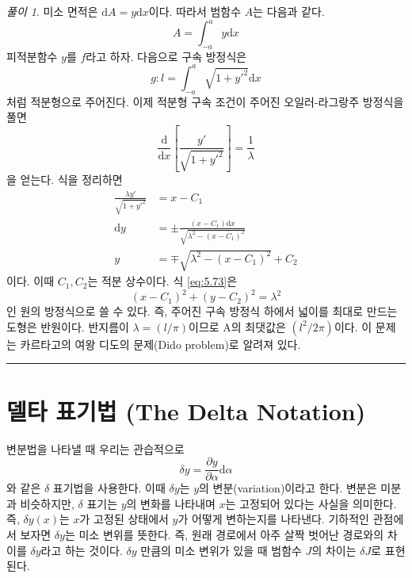 \documentclass[chapter, oneside, b5paper]{oblivoir}
\theoremstyle{plain}
\theoremstyle{definition}
\theoremstyle{remark}
\newtheorem*{solution}{풀이}
\begin{document}
\begin{solution}
    미소 면적은 $\mathrm{d}A = y \mathrm{d}x$이다. 따라서 범함수 $A$는 다음과 같다.
    \begin{equation}
        A = \int_{-a}^{a} y \mathrm{d}x
    \end{equation}
    피적분함수 $y$를 $f$라고 하자. 다음으로 구속 방정식은
    \begin{equation}
        g : l = \int_{-a}^{a} \sqrt{1 + {y'}^2} \mathrm{d}x
    \end{equation}
    처럼 적분형으로 주어진다. 이제 적분형 구속 조건이 주어진 오일러-라그랑주 방정식을 풀면
    \begin{equation}
    \frac{\mathrm{d}}{\mathrm{d}x} \left[\frac{y'}{\sqrt{1 + y'^2}} \right] = \frac{1}{\lambda}
    \end{equation}
    을 얻는다. 식을 정리하면
    \begin{equation}
        \begin{aligned}
            \frac{\lambda y'}{\sqrt{1 + y'^2}} &= x-C_1 \\
            \mathrm{d}y &= \pm \frac{(x-C_1)\mathrm{d}x}{\sqrt{\lambda^2-{(x-C_1)}^2}} \\
            y &= \mp \sqrt{\lambda^2-{(x-C_1)}^2} + C_2
        \end{aligned}
        \label{eq:5.73}
    \end{equation}
    이다. 이때 $C_1, C_2$는 적분 상수이다. 식 \ref{eq:5.73}은
    \begin{equation}
        {(x-C_1)}^2 + {(y-C_2)}^2 = \lambda^2
    \end{equation}
    인 원의 방정식으로 쓸 수 있다. 즉, 주어진 구속 방정식 하에서 넓이를 최대로 만드는 도형은 반원이다. 반지름이 $\lambda = (l/\pi)$이므로 A의 최댓값은 $(l^2/2 \pi)$이다. 이 문제는 카르타고의 여왕 디도의 문제(Dido problem)로 알려져 있다.
\end{solution}

\noindent\rule{\textwidth}{0.8pt} %
\vspace{1em} %

\section{델타 표기법 (The Delta Notation)}
변분법을 나타낼 때 우리는 관습적으로
\begin{equation}
    \delta y = \frac{\partial y}{\partial{\alpha}} \mathrm{d}\alpha
\end{equation}
와 같은 $\delta$ 표기법을 사용한다. 이때 $\delta y$는 $y$의 변분(variation)이라고 한다. 변분은 미분과 비슷하지만, $\delta$ 표기는 $y$의 변화를 나타내며 $x$는 고정되어 있다는 사실을 의미한다. 즉, $\delta y(x)$는 $x$가 고정된 상태에서 $y$가 어떻게 변하는지를 나타낸다. 기하적인 관점에서 보자면 $\delta y$는 미소 변위를 뜻한다. 즉, 원래 경로에서 아주 살짝 벗어난 경로와의 차이를 $\delta y$라고 하는 것이다. $\delta y$ 만큼의 미소 변위가 있을 때 범함수 $J$의 차이는 $\delta J$로 표현된다. 
\end{document}
